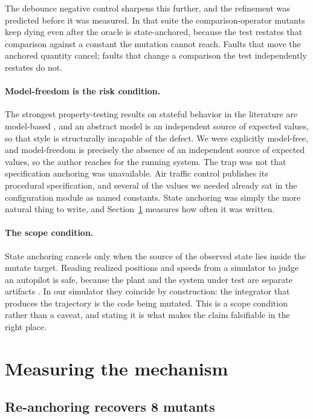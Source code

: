 \documentclass[12pt]{article}
\begin{document}
The debounce negative control sharpens this further, and the refinement was
predicted before it was measured. In that suite the comparison-operator mutants
keep dying even after the oracle is state-anchored, because the test restates
that comparison against a constant the mutation cannot reach. Faults that move
the anchored quantity cancel; faults that change a comparison the test
independently restates do not.

\paragraph{Model-freedom is the risk condition.} The strongest property-testing
results on stateful behavior in the literature are model-based
\cite{hughes}, and an abstract model is an independent source of expected values,
so that style is structurally incapable of the defect. We were explicitly
model-free, and model-freedom is precisely the absence of an independent source
of expected values, so the author reaches for the running system. The trap was
not that specification anchoring was unavailable. Air traffic control publishes
its procedural specification, and several of the values we needed already sat in
the configuration module as named constants. State anchoring was simply the more
natural thing to write, and Section~\ref{sec:measuring} measures how often it was
written.

\paragraph{The scope condition.} State anchoring cancels only when the source of
the observed state lies inside the mutate target. Reading realized positions and
speeds from a simulator to judge an autopilot is safe, because the plant and the
system under test are separate artifacts \cite{li2024}. In our simulator they
coincide by construction: the integrator that produces the trajectory is the code
being mutated. This is a scope condition rather than a caveat, and stating it is
what makes the claim falsifiable in the right place.

\section{Measuring the mechanism}
\label{sec:measuring}

\subsection{Re-anchoring recovers 8 mutants}
\end{document}
